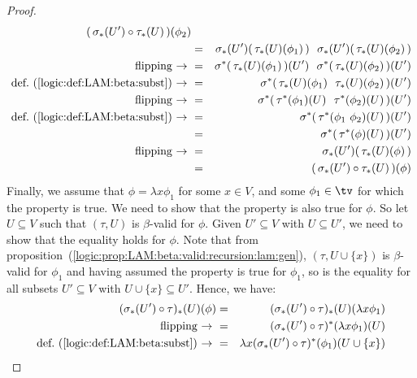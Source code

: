 \begin{proof}
\begin{eqnarray*}
               (\,\sigma_{*}(U')\circ\tau_{*}(U)\,)(\phi_{2})\\
            &=&\sigma_{*}(U')(\,\tau_{*}(U)(\phi_{1})\,)\ \ 
               \sigma_{*}(U')(\,\tau_{*}(U)(\phi_{2})\,)\\
            \mbox{flipping\ $\to$\ }
            &=&\sigma^{*}(\,\tau_{*}(U)(\phi_{1})\,)(U')\ \ 
               \sigma^{*}(\,\tau_{*}(U)(\phi_{2})\,)(U')\\
            \mbox{def.~(\ref{logic:def:LAM:beta:subst})\ $\to$\ }
            &=&\sigma^{*}(\,\tau_{*}(U)(\phi_{1})\ \ 
                            \tau_{*}(U)(\phi_{2})\,)(U')\\ 
            \mbox{flipping\ $\to$\ }
            &=&\sigma^{*}(\,\tau^{*}(\phi_{1})(U)\ \ 
                            \tau^{*}(\phi_{2})(U)\,)(U')\\
            \mbox{def.~(\ref{logic:def:LAM:beta:subst})\ $\to$\ }
            &=&\sigma^{*}(\,\tau^{*}(\phi_{1}\ \phi_{2})(U)\,)(U')\\
            &=&\sigma^{*}(\,\tau^{*}(\phi)(U)\,)(U')\\
            \mbox{flipping\ $\to$\ }
            &=&\sigma_{*}(U')(\,\tau_{*}(U)(\phi)\,)\\
            &=&(\,\sigma_{*}(U')\circ\tau_{*}(U)\,)(\phi)
        \end{eqnarray*}
    Finally, we assume that $\phi=\lambda x\phi_{1}$ for some $x\in V$, and
    some $\phi_{1}\in\tv$ for which the property is true. We need to show
    that the property is also true for $\phi$. So let $U\subseteq V$ such 
    that $(\tau,U)$ is $\beta$-valid for $\phi$. Given $U'\subseteq V$  with
    $U\subseteq U'$, we need to show that the equality holds for $\phi$. 
    Note that from 
    proposition~(\ref{logic:prop:LAM:beta:valid:recursion:lam:gen}), 
    $(\tau, U\cup\{x\})$ is $\beta$-valid for $\phi_{1}$ and having assumed 
    the property is true for $\phi_{1}$, so is the equality for all subsets 
    $U'\subseteq V$ with $U\cup\{x\}\subseteq U'$. Hence, we have:
        \begin{eqnarray*}(\sigma_{*}(U')\circ\tau)_{*}(U)(\phi)
            &=&(\sigma_{*}(U')\circ\tau)_{*}(U)(\lambda x\phi_{1})\\
            \mbox{flipping\ $\to$\ }
            &=&(\sigma_{*}(U')\circ\tau)^{*}(\lambda x\phi_{1})(U)\\
            \mbox{def.~(\ref{logic:def:LAM:beta:subst})\ $\to$\ }
            &=&\lambda x(\sigma_{*}(U')\circ\tau)^{*}(\phi_{1})(U\cup\{x\})\\

\end{eqnarray*}
\end{proof}
